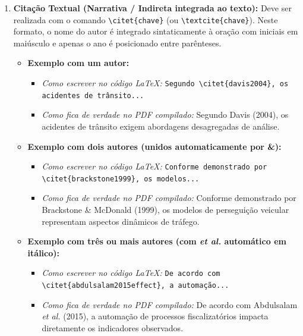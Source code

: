 \begin{enumerate}
  \item \textbf{Citação Textual (Narrativa / Indireta integrada ao texto):} Deve ser realizada com o comando \texttt{\textbackslash citet\{chave\}} (ou \texttt{\textbackslash textcite\{chave\}}). Neste formato, o nome do autor é integrado sintaticamente à oração com iniciais em maiúsculo e apenas o ano é posicionado entre parênteses.
  \begin{itemize}
    \item \textbf{Exemplo com um autor:}
    \begin{itemize}
      \item \textit{Como escrever no código \LaTeX:} \texttt{Segundo \textbackslash citet\{davis2004\}, os acidentes de trânsito...}
      \item \textit{Como fica de verdade no PDF compilado:} Segundo Davis (2004), os acidentes de trânsito exigem abordagens desagregadas de análise.
    \end{itemize}

    \item \textbf{Exemplo com dois autores (unidos automaticamente por \&):}
    \begin{itemize}
      \item \textit{Como escrever no código \LaTeX:} \texttt{Conforme demonstrado por \textbackslash citet\{brackstone1999\}, os modelos...}
      \item \textit{Como fica de verdade no PDF compilado:} Conforme demonstrado por Brackstone \& McDonald (1999), os modelos de perseguição veicular representam aspectos dinâmicos de tráfego.
    \end{itemize}

    \item \textbf{Exemplo com três ou mais autores (com \textit{et al.} automático em itálico):}
    \begin{itemize}
      \item \textit{Como escrever no código \LaTeX:} \texttt{De acordo com \textbackslash citet\{abdulsalam2015effect\}, a automação...}
      \item \textit{Como fica de verdade no PDF compilado:} De acordo com Abdulsalam \textit{et al.} (2015), a automação de processos fiscalizatórios impacta diretamente os indicadores observados.
    \end{itemize}
  \end{itemize}


\end{enumerate}
